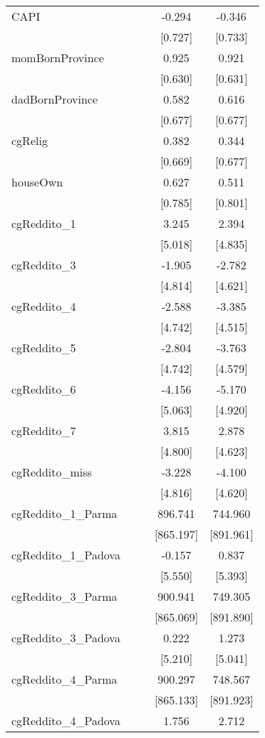 \documentclass[]{article}
\begin{document}
\begin{tabular}{lcccc}
CAPI &  &  & -0.294 & -0.346 \\
 &  &  & [0.727] & [0.733] \\
momBornProvince &  &  & 0.925 & 0.921 \\
 &  &  & [0.630] & [0.631] \\
dadBornProvince &  &  & 0.582 & 0.616 \\
 &  &  & [0.677] & [0.677] \\
cgRelig &  &  & 0.382 & 0.344 \\
 &  &  & [0.669] & [0.677] \\
houseOwn &  &  & 0.627 & 0.511 \\
 &  &  & [0.785] & [0.801] \\
cgReddito\_1 &  &  & 3.245 & 2.394 \\
 &  &  & [5.018] & [4.835] \\
cgReddito\_3 &  &  & -1.905 & -2.782 \\
 &  &  & [4.814] & [4.621] \\
cgReddito\_4 &  &  & -2.588 & -3.385 \\
 &  &  & [4.742] & [4.515] \\
cgReddito\_5 &  &  & -2.804 & -3.763 \\
 &  &  & [4.742] & [4.579] \\
cgReddito\_6 &  &  & -4.156 & -5.170 \\
 &  &  & [5.063] & [4.920] \\
cgReddito\_7 &  &  & 3.815 & 2.878 \\
 &  &  & [4.800] & [4.623] \\
cgReddito\_miss &  &  & -3.228 & -4.100 \\
 &  &  & [4.816] & [4.620] \\
cgReddito\_1\_Parma &  &  & 896.741 & 744.960 \\
 &  &  & [865.197] & [891.961] \\
cgReddito\_1\_Padova &  &  & -0.157 & 0.837 \\
 &  &  & [5.550] & [5.393] \\
cgReddito\_3\_Parma &  &  & 900.941 & 749.305 \\
 &  &  & [865.069] & [891.890] \\
cgReddito\_3\_Padova &  &  & 0.222 & 1.273 \\
 &  &  & [5.210] & [5.041] \\
cgReddito\_4\_Parma &  &  & 900.297 & 748.567 \\
 &  &  & [865.133] & [891.923] \\
cgReddito\_4\_Padova &  &  & 1.756 & 2.712 \\

\end{tabular}
\end{document}
